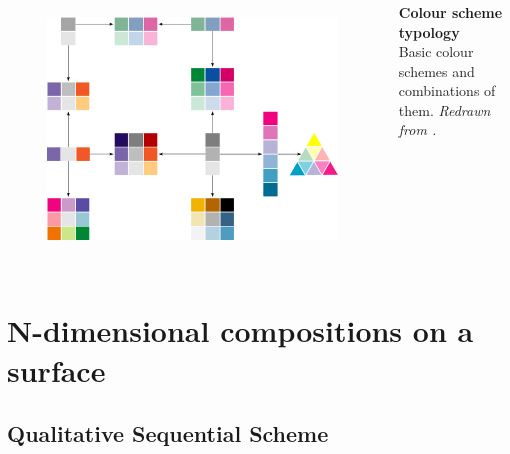 \documentclass{beamer}
\begin{document}
\begin{frame}
\frametitle{\insertsection}

\begin{columns}[c]

\begin{figure}[htb!]
\includegraphics[width = \textwidth]{../fig/brewer_typology.pdf}\\
\end{figure}

\footnotesize\textbf{Colour scheme typology}\\ Basic colour schemes and combinations of them. \scriptsize\emph{Redrawn from \textcite{Brewer1994}.}

\end{columns}

\end{frame}

\section{N-dimensional compositions on a surface} %

\subsection{Qualitative Sequential Scheme}
\end{document}
